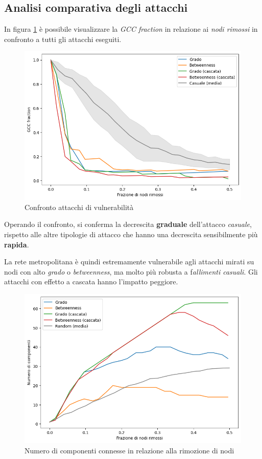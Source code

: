 \subsection{Analisi comparativa degli attacchi}
In figura \ref{fig: Confronto attacchi di vulnerabilità} è possibile visualizzare la \textit{GCC fraction} in relazione ai \textit{nodi rimossi} in confronto a tutti gli attacchi eseguiti.

\vspace{1em}
\begin{figure}[h!]
    \centering
    \includegraphics[width=0.8\linewidth]{Immagini//Capitoli//cap5/atk_cfr.png}
    \caption{Confronto attacchi di vulnerabilità}
    \label{fig: Confronto attacchi di vulnerabilità}
\end{figure}
\vspace{1em}

Operando il confronto, si conferma la decrescita \textbf{graduale} dell'attacco \textit{casuale}, rispetto alle altre tipologie di attacco che hanno una decrescita sensibilmente più \textbf{rapida}.

La rete metropolitana è quindi estremamente vulnerabile agli attacchi mirati su nodi con alto \textit{grado} o \textit{betweenness}, ma molto più robusta a f\textit{allimenti casuali}. Gli attacchi con effetto a cascata hanno l’impatto peggiore.

\vspace{1em}
\begin{figure}[h!]
    \centering
    \includegraphics[width=0.8\linewidth]{Immagini//Capitoli//cap5/removed_cfr.png}
    \caption{Numero di componenti connesse in relazione alla rimozione di nodi}
    \label{fig: Numero di componenti connesse in relazione alla rimozione di nodi}
\end{figure}
\vspace{1em}

